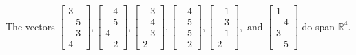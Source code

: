 \begin{exercise}
\begin{exerciseStatement}
  \end{exerciseStatement}
  \begin{exerciseAnswer}
   The vectors \(\left[\begin{array}{r}
3 \\
-5 \\
-3 \\
4
\end{array}\right] , \left[\begin{array}{r}
-4 \\
-5 \\
4 \\
-2
\end{array}\right] , \left[\begin{array}{r}
-3 \\
-4 \\
-3 \\
2
\end{array}\right] , \left[\begin{array}{r}
-4 \\
-5 \\
-5 \\
-2
\end{array}\right] , \left[\begin{array}{r}
-1 \\
-3 \\
-1 \\
2
\end{array}\right] , \text{ and } \left[\begin{array}{r}
1 \\
-4 \\
3 \\
-5
\end{array}\right]\) 
  	 do  
	span \(\mathbb{R}^4\).
  


  \end{exerciseAnswer}
\end{exercise}